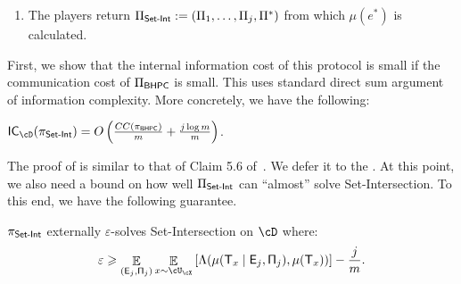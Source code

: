 \documentclass[11pt,letterpaper]{article}
\newcommand{\eps}{\varepsilon}
\DeclareMathOperator*{\E}{\mathbb{E}}
\renewcommand{\geq}{\geqslant}
\theoremstyle{definition}
\newcommand{\estar}{e^{\ast}}
\newcommand{\rPi}{\rv{\Pi}}
\newcommand{\bhpc}{\ensuremath{\textnormal{\textsf{BHPC}}}\xspace}
\newenvironment{tbox}{\begin{tcolorbox}[
		enlarge top by=5pt,
		enlarge bottom by=5pt,
		 breakable,
		 boxsep=0pt,
                  left=4pt,
                  right=4pt,
                  top=10pt,
                  boxrule=1pt,toprule=1pt,
                  colback=white,
                  arc=-1pt,
                  ]%
	}
{\end{tcolorbox}}
\newcommand{\Prot}{\ensuremath{\Pi}}
\newcommand{\rv}[1]{\ensuremath{\mathsf{#1}}}
\newcommand{\rT}{\rv{T}}
\newcommand{\rE}{\rv{E}}
\newcommand{\SI}{\ensuremath{\textnormal{\textsf{Set-Int}}}\xspace}
\newcommand{\ICost}[2]{\ensuremath{\textnormal{\textsf{IC}}_{#2}(#1)}\xspace}
\begin{document}
\begin{tbox}
\begin{enumerate}
\begin{enumerate}
           \item \textbf{Fixing pointer:} Alice and Bob compute the pointer $z_{q}$ using the fact
           that for any underlying instance $(A_x,B_x) \in (A, B) \setminus (A_{x_i},B_{x_i})$ either Alice or Bob knows the entire instance. We use $\Prot^*$ to denote the cumulative transcript generated by this step in all rounds.
           
           \item They stop if $x_i = z_{q}$.
          \end{enumerate} 
           
           
	\item The players return $\Pi_\SI := (\Pi_1,\ldots,\Pi_j,\Pi^*)$ from which $\mu(\estar)$ is calculated.
    \end{enumerate}
\end{tbox}

First, we show that the internal information cost of this protocol is small if the communication cost of $\Pi_\bhpc$ is small. This uses standard direct sum argument of information complexity. More concretely, we have the following:

\begin{claim} \label{clm:nonmdirect-sum}
    $\ICost{\pi_\SI}{\cD} = O\left(\frac{CC(\pi_\bhpc)}{m} + \frac{j \log m} m\right)$.
\end{claim}



The proof of  is similar to that of Claim 5.6 of~\cite{AssadiCK19}. We defer it to the . At this point, we also need a bound on how well $\Pi_\SI$ can ``almost'' solve Set-Intersection. To this end, we have the following guarantee.

\begin{claim} \label{clm:nonmaverage-coordinate}
$\pi_\SI$ externally $\eps$-solves Set-Intersection on $\cD$ where:
\[
  \eps \geq \E_{(\rE_j, \rPi_j)}\E_{x \sim \cU_\cX}
  \left[\Lambda(\mu(\rT_x \mid \rE_j, \rPi_j), \mu(\rT_x)) \right] - \frac{j} m.
\]
\end{claim}
\end{document}
